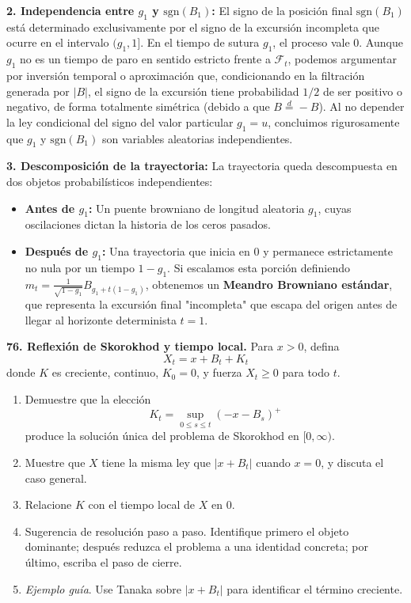\documentclass[11pt, letterpaper]{article}
\begin{document}
\begin{solucion}
    \textbf{2. Independencia entre $g_1$ y $\text{sgn}(B_1)$:}
    El signo de la posición final $\text{sgn}(B_1)$ está determinado exclusivamente por el signo de la excursión incompleta que ocurre en el intervalo $(g_1, 1]$.
    En el tiempo de sutura $g_1$, el proceso vale 0. Aunque $g_1$ no es un tiempo de paro en sentido estricto frente a $\mathcal{F}_t$, podemos argumentar por inversión temporal o aproximación que, condicionando en la filtración generada por $|B|$, el signo de la excursión tiene probabilidad $1/2$ de ser positivo o negativo, de forma totalmente simétrica (debido a que $B \stackrel{d}{=} -B$).
    Al no depender la ley condicional del signo del valor particular $g_1 = u$, concluimos rigurosamente que $g_1$ y $\text{sgn}(B_1)$ son variables aleatorias independientes.

    \textbf{3. Descomposición de la trayectoria:}
    La trayectoria queda descompuesta en dos objetos probabilísticos independientes:
    \begin{itemize}
        \item \textbf{Antes de $g_1$:} Un puente browniano de longitud aleatoria $g_1$, cuyas oscilaciones dictan la historia de los ceros pasados.
        \item \textbf{Después de $g_1$:} Una trayectoria que inicia en 0 y permanece estrictamente no nula por un tiempo $1-g_1$. Si escalamos esta porción definiendo $m_t = \frac{1}{\sqrt{1-g_1}} B_{g_1 + t(1-g_1)}$, obtenemos un \textbf{Meandro Browniano estándar}, que representa la excursión final "incompleta" que escapa del origen antes de llegar al horizonte determinista $t=1$.
    \end{itemize}
\end{solucion}

\newpage

\begin{ejercicio}
    \textbf{76. Reflexión de Skorokhod y tiempo local.} Para $x>0$, defina
    \[ X_{t}=x+B_{t}+K_{t} \]
    donde $K$ es creciente, continuo, $K_{0}=0$, y fuerza $X_{t}\ge 0$ para todo $t$.
    \begin{enumerate}
        \item Demuestre que la elección
        \[ K_{t}=\sup_{0\le s\le t}(-x-B_{s})^{+} \]
        produce la solución única del problema de Skorokhod en $[0,\infty)$.
        \item Muestre que $X$ tiene la misma ley que $|x+B_{t}|$ cuando $x=0$, y discuta el caso general.
        \item Relacione $K$ con el tiempo local de $X$ en 0.
        \item Sugerencia de resolución paso a paso. Identifique primero el objeto dominante; después reduzca el problema a una identidad concreta; por último, escriba el paso de cierre.
        \item \textit{Ejemplo guía}. Use Tanaka sobre $|x+B_{t}|$ para identificar el término creciente.
    \end{enumerate}
\end{ejercicio}
\end{document}
